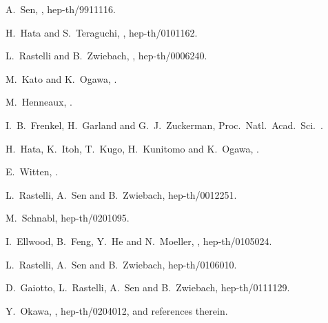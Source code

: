 \documentclass[a4paper,seceq,preprint]{ptptex}
\begin{document}
\begin{thebibliography}{99}
A.~Sen,
, hep-th/9911116.

H.~Hata and S.~Teraguchi,
, hep-th/0101162.

L.~Rastelli and B.~Zwiebach,
, hep-th/0006240.

M.~Kato and K.~Ogawa,
.

M.~Henneaux,
.

I.~B.~Frenkel, H.~Garland and G.~J.~Zuckerman,
Proc.~Natl.~Acad.~Sci.\ .

H.~Hata, K.~Itoh, T.~Kugo, H.~Kunitomo and K.~Ogawa,
.

E.~Witten,
.

L.~Rastelli, A.~Sen and B.~Zwiebach,
hep-th/0012251.

M.~Schnabl,
hep-th/0201095.

I.~Ellwood, B.~Feng, Y.~He and N.~Moeller,
, hep-th/0105024.

L.~Rastelli, A.~Sen and B.~Zwiebach,
hep-th/0106010.

D.~Gaiotto, L.~Rastelli, A.~Sen and B.~Zwiebach,
hep-th/0111129.

Y.~Okawa,
, hep-th/0204012,
and references therein.
\end{thebibliography}
\end{document}

